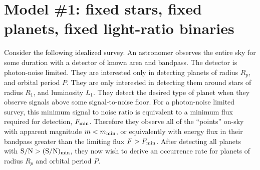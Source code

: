 \documentclass{emulateapj}
\begin{document}
\section{Model \#1: fixed stars, fixed planets, fixed light-ratio binaries}
\label{sec:model_1}

Consider the following idealized survey.
An astronomer observes the entire sky for some duration with a detector of 
known area and bandpass.
The detector is photon-noise limited.
They are interested only in detecting planets of radius $R_p$, and orbital 
period $P$. %
They are only interested in detecting them around stars of radius $R_1$, 
and luminosity $L_1$. %
They detect the desired type of planet when they observe signals 
above some signal-to-noise floor.
For a photon-noise limited survey, this minimum signal to noise ratio is 
equivalent to a minimum flux required for detection, $F_{\rm min}$.
Therefore they observe all of the ``points'' on-sky with apparent 
magnitude $m < m_{\rm min}$, or equivalently with energy flux in their 
bandpass greater than the limiting flux $F > F_{\rm min}$.
After detecting all planets with ${\rm S/N} > {\rm (S/N)_{min}}$, they now 
wish to derive an occurrence rate for planets of radius $R_p$ and 
orbital period $P$.
\end{document}
